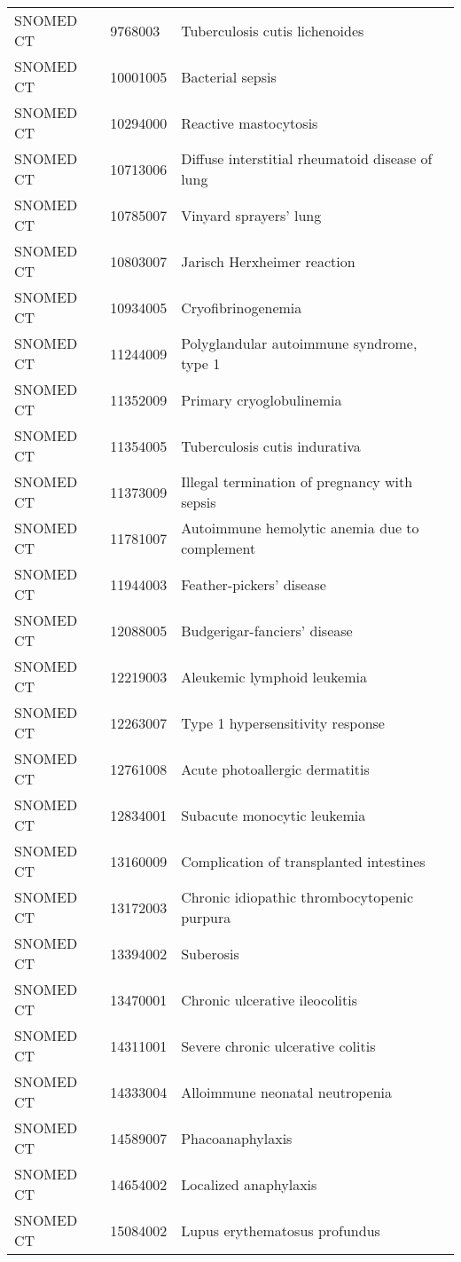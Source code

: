 \begin{longtable}{p{}p{}p{}}
  SNOMED CT & 9768003 & Tuberculosis cutis lichenoides \\ 
  SNOMED CT & 10001005 & Bacterial sepsis \\ 
  SNOMED CT & 10294000 & Reactive mastocytosis \\ 
  SNOMED CT & 10713006 & Diffuse interstitial rheumatoid disease of lung \\ 
  SNOMED CT & 10785007 & Vinyard sprayers' lung \\ 
  SNOMED CT & 10803007 & Jarisch Herxheimer reaction \\ 
  SNOMED CT & 10934005 & Cryofibrinogenemia \\ 
  SNOMED CT & 11244009 & Polyglandular autoimmune syndrome, type 1 \\ 
  SNOMED CT & 11352009 & Primary cryoglobulinemia \\ 
  SNOMED CT & 11354005 & Tuberculosis cutis indurativa \\ 
  SNOMED CT & 11373009 & Illegal termination of pregnancy with sepsis \\ 
  SNOMED CT & 11781007 & Autoimmune hemolytic anemia due to complement \\ 
  SNOMED CT & 11944003 & Feather-pickers' disease \\ 
  SNOMED CT & 12088005 & Budgerigar-fanciers' disease \\ 
  SNOMED CT & 12219003 & Aleukemic lymphoid leukemia \\ 
  SNOMED CT & 12263007 & Type 1 hypersensitivity response \\ 
  SNOMED CT & 12761008 & Acute photoallergic dermatitis \\ 
  SNOMED CT & 12834001 & Subacute monocytic leukemia \\ 
  SNOMED CT & 13160009 & Complication of transplanted intestines \\ 
  SNOMED CT & 13172003 & Chronic idiopathic thrombocytopenic purpura \\ 
  SNOMED CT & 13394002 & Suberosis \\ 
  SNOMED CT & 13470001 & Chronic ulcerative ileocolitis \\ 
  SNOMED CT & 14311001 & Severe chronic ulcerative colitis \\ 
  SNOMED CT & 14333004 & Alloimmune neonatal neutropenia \\ 
  SNOMED CT & 14589007 & Phacoanaphylaxis \\ 
  SNOMED CT & 14654002 & Localized anaphylaxis \\ 
  SNOMED CT & 15084002 & Lupus erythematosus profundus \\ 

\end{longtable}
